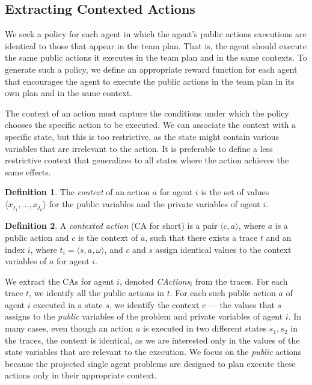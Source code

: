 \documentclass[letterpaper]{article} %
\theoremstyle{definition}
\newtheorem{definition}{Definition}
\newcommand{\eliran}[1]{\textbf{[\color{red}ELIRAN:#1]}}
\newcommand{\ronen}[1]{\textbf{[\color{blue}RONEN:#1]}}
\newcommand{\cact}[1]{{\em CActions$_#1$}}
\begin{document}
\subsection{Extracting Contexted Actions}

We seek a policy for each agent in which the agent's public actions executions are identical to those that appear in the team plan. That is, the agent should execute the same public actions it executes in the team plan and in the same contexts.
To generate such a policy, we define an appropriate reward function for each agent that encourages the agent to execute the public actions in the team plan in its own plan and in the same context.

The context of an action must capture the conditions under which the policy chooses the specific action to be executed. We can associate the context with a specific state, but this is too restrictive, as the state might contain various variables that are irrelevant to the action. It is preferable to define a less restrictive context that generalizes to all states where the action achieves the same effects. 


\begin{definition}
The {\em context} of an action $a$ for agent $i$ is the set of values $\langle x_{j_1},...,x_{j_k} \rangle$ for the public variables and the private variables of agent $i$.
\end{definition}

\begin{definition}
A {\em contexted action} (CA for short) is a pair $\langle c,a \rangle$, where $a$ is a public action and $c$ is the context of $a$, such that there exists a trace $t$ and an index $i$, where $t_i=\langle s,a,\omega \rangle$, and $c$ and $s$ assign identical values to the context variables of $a$ for agent $i$.
\end{definition}

We extract the CAs for agent $i$, denoted \cact{i} from the traces.
For each trace $t$, we identify all the public actions in $t$. For each such public action $a$ of agent $i$ executed in a state $s$, we identify the context $c$ --- the values that $s$ assigns to the {\em public} variables of the problem and private variables of agent $i$. In many cases, even though an action $a$ is executed in two different states $s_1,s_2$ in the traces, the context is identical, as we are interested only in the values of the state variables that are relevant to the execution.
We focus on the \emph{public} actions because the projected single agent problems are designed to plan execute these actions only in their appropriate context.
\end{document}
